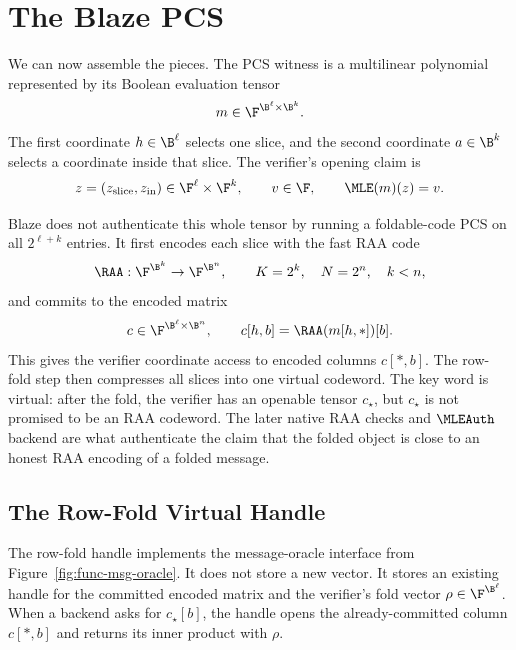 \section{The Blaze PCS}

We can now assemble the pieces.  The PCS witness is a multilinear polynomial
represented by its Boolean evaluation tensor
\[
  m\in\F^{\B^\ell\times\B^k}.
\]
The first coordinate \(h\in\B^\ell\) selects one slice, and the second
coordinate \(a\in\B^k\) selects a coordinate inside that slice.  The verifier's
opening claim is
\[
  z=(z_{\mathrm{slice}},z_{\mathrm{in}})\in\F^\ell\times\F^k,
  \qquad
  v\in\F,
  \qquad
  \MLE(m)(z)=v.
\]

Blaze does not authenticate this whole tensor by running a foldable-code PCS on
all \(2^{\ell+k}\) entries.  It first encodes each slice with the fast RAA code
\[
  \RAA:\F^{\B^k}\to\F^{\B^n},
  \qquad K=2^k,\quad N=2^n,\quad k<n,
\]
and commits to the encoded matrix
\[
  c\in\F^{\B^\ell\times\B^n},
  \qquad
  c[h,b]=\RAA(m[h,\ast])[b].
\]
This gives the verifier coordinate access to encoded columns \(c[\ast,b]\).
The row-fold step then compresses all slices into one virtual codeword.  The
key word is virtual: after the fold, the verifier has an openable tensor
\(c_\star\), but \(c_\star\) is not promised to be an RAA codeword.  The later
native RAA checks and \(\MLEAuth\) backend are what authenticate the claim that
the folded object is close to an honest RAA encoding of a folded message.

\subsection{The Row-Fold Virtual Handle}

The row-fold handle implements the message-oracle interface from
Figure~\ref{fig:func-msg-oracle}.  It does not store a new vector.  It stores an
existing handle for the committed encoded matrix and the verifier's fold vector
\(\rho\in\F^{\B^\ell}\).  When a backend asks for \(c_\star[b]\), the handle
opens the already-committed column \(c[\ast,b]\) and returns its inner product
with \(\rho\).

